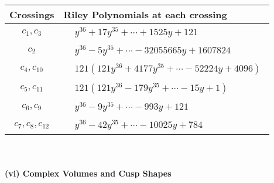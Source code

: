 \documentclass[1p]{elsarticle_modified}
\theoremstyle{definition}
\begin{document}
\begin{tabular}{m{50pt}|m{274pt}}
Crossings & \hspace{64pt}Riley Polynomials at each crossing \\
\hline $$\begin{aligned}c_{1},c_{3}\end{aligned}$$&$\begin{aligned}
&y^{36}+17 y^{35}+\cdots+1525 y+121
\end{aligned}$\\
\hline $$\begin{aligned}c_{2}\end{aligned}$$&$\begin{aligned}
&y^{36}-5 y^{35}+\cdots-32055665 y+1607824
\end{aligned}$\\
\hline $$\begin{aligned}c_{4},c_{10}\end{aligned}$$&$\begin{aligned}
&121(121 y^{36}+4177 y^{35}+\cdots-52224 y+4096)
\end{aligned}$\\
\hline $$\begin{aligned}c_{5},c_{11}\end{aligned}$$&$\begin{aligned}
&121(121 y^{36}-179 y^{35}+\cdots-15 y+1)
\end{aligned}$\\
\hline $$\begin{aligned}c_{6},c_{9}\end{aligned}$$&$\begin{aligned}
&y^{36}-9 y^{35}+\cdots-993 y+121
\end{aligned}$\\
\hline $$\begin{aligned}c_{7},c_{8},c_{12}\end{aligned}$$&$\begin{aligned}
&y^{36}-42 y^{35}+\cdots-10025 y+784
\end{aligned}$\\
\hline
\end{tabular}\\~\\
\newpage\flushleft \textbf{(vi) Complex Volumes and Cusp Shapes}
\end{document}
